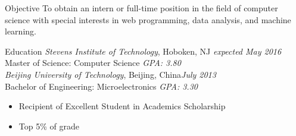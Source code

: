 \documentclass{resume} %
\begin{document}
\begin{rSection}{Objective}
To obtain an intern or full-time position in the field of computer science with special interests in web programming, data analysis, and machine learning.
\end{rSection}

\begin{rSection}{Education}
{\sl Stevens Institute of Technology}, Hoboken, NJ \hfill {\em expected May 2016} \\ 
Master of Science: Computer Science {\em GPA: 3.80}\\
{\sl Beijing University of Technology}, Beijing, China\hfill {\em July 2013} \\ 
Bachelor of Engineering: Microelectronics	   {\em GPA: 3.30 }
\begin{itemize} 
 \setlength\itemsep{-0.5em}
 \renewcommand\labelitemi{--}
\item Recipient of Excellent Student in Academics Scholarship
\item Top 5\% of grade
\end{itemize} 
\end{rSection}

\end{document}
